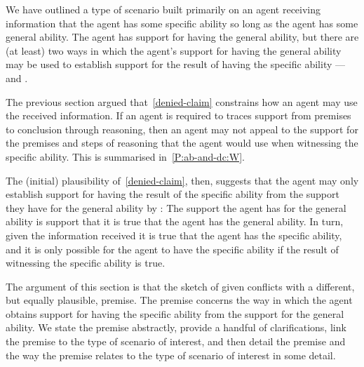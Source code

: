 \begin{note}
  We have outlined a type of scenario built primarily on an agent receiving information that the agent has some specific ability so long as the agent has some general ability.
  The agent has support for having the general ability, but there are (at least) two ways in which the agent's support for having the general ability may be used to establish support for {\color{red} the result of having the specific ability} --- \AR{} and \WR{}.

  The previous section argued that~\ref{denied-claim} constrains how an agent may use the received information.
  If an agent is required to traces support from premises to conclusion through reasoning, then an agent may not appeal to the support for the premises and steps of reasoning that the agent would use when witnessing the specific ability.
  {\color{red} This is summarised in~\ref{P:ab-and-dc:W}.}

  The (initial) plausibility of~\ref{denied-claim}, then, suggests that the agent may only establish support for having the {\color{red} result of the specific ability} from the support they have for the general ability by \AR{}:
  The support the agent has for the general ability is support that it is true that the agent has the general ability.
  In turn, given the information received it is true that the agent has the specific ability, and it is only possible for the agent to have the specific ability if the result of witnessing the specific ability is true.

  The argument of this section is that the sketch of \AR{} given conflicts with a different, but equally plausible, premise.
  The premise concerns the way in which the agent obtains support for having the specific ability from the support for the general ability.
  We state the premise abstractly,  provide a handful of clarifications, link the premise to the type of scenario of interest, and then detail the premise and the way the premise relates to the type of scenario of interest in some detail.
\end{note}

